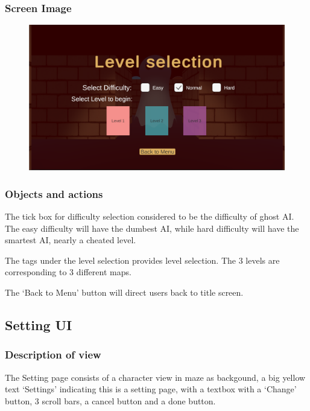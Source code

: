 \documentclass[11pt]{article}
\begin{document}
\subsubsection{Screen Image}
\begin{figure}[H]
    \centering
    \includegraphics*[scale=0.2]{UI1.1LevelSelection.png}
\end{figure}
\subsubsection{Objects and actions}
The tick box for difficulty selection considered to be the difficulty of ghost AI. The easy difficulty will have the dumbest AI, while hard difficulty will have the smartest AI, nearly a cheated level.

The tags under the level selection provides level selection. The 3 levels are corresponding to 3 different maps.

The `Back to Menu' button will direct users back to title screen.


\subsection{Setting UI}
\subsubsection{Description of view}
The Setting page consists of a character view in maze as backgound, a big yellow text `Settings' indicating this is a setting page, with a textbox with a `Change' button, 3 scroll bars, a cancel button and a done button.
\end{document}
